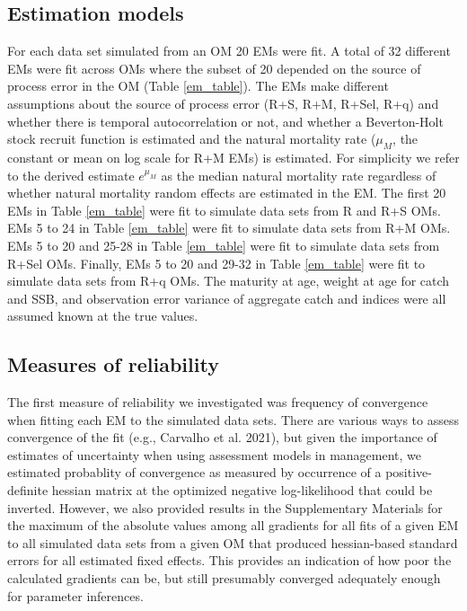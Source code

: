 \documentclass[
  12pt,
]{article}
\begin{document}
\hypertarget{estimation-models}{%
\subsection*{Estimation models}\label{estimation-models}}

For each data set simulated from an OM 20 EMs were fit. A total of 32
different EMs were fit across OMs where the subset of 20 depended on the
source of process error in the OM (Table \ref{em_table}). The EMs make
different assumptions about the source of process error (R+S, R+M,
R+Sel, R+q) and whether there is temporal autocorrelation or not, and
whether a Beverton-Holt stock recruit function is estimated and the
natural mortality rate (\(\mu_M\), the constant or mean on log scale for
R+M EMs) is estimated. For simplicity we refer to the derived estimate
\(e^{\mu_M}\) as the median natural mortality rate regardless of whether
natural mortality random effects are estimated in the EM. The first 20
EMs in Table \ref{em_table} were fit to simulate data sets from R and
R+S OMs. EMs 5 to 24 in Table \ref{em_table} were fit to simulate data
sets from R+M OMs. EMs 5 to 20 and 25-28 in Table \ref{em_table} were
fit to simulate data sets from R+Sel OMs. Finally, EMs 5 to 20 and 29-32
in Table \ref{em_table} were fit to simulate data sets from R+q OMs. The
maturity at age, weight at age for catch and SSB, and observation error
variance of aggregate catch and indices were all assumed known at the
true values.

\hypertarget{measures-of-reliability}{%
\subsection*{Measures of reliability}\label{measures-of-reliability}}

The first measure of reliability we investigated was frequency of
convergence when fitting each EM to the simulated data sets. There are
various ways to assess convergence of the fit (e.g., Carvalho et al.
2021), but given the importance of estimates of uncertainty when using
assessment models in management, we estimated probablity of convergence
as measured by occurrence of a positive-definite hessian matrix at the
optimized negative log-likelihood that could be inverted. However, we
also provided results in the Supplementary Materials for the maximum of
the absolute values among all gradients for all fits of a given EM to
all simulated data sets from a given OM that produced hessian-based
standard errors for all estimated fixed effects. This provides an
indication of how poor the calculated gradients can be, but still
presumably converged adequately enough for parameter inferences.
\end{document}
